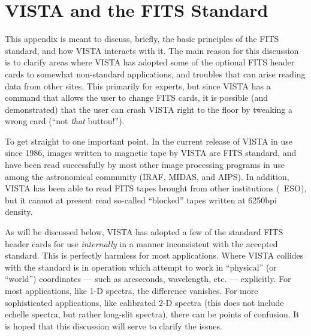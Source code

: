 %
%
%
%
%
%

%
%
%
%
%

\chapter{VISTA and the FITS Standard}

This appendix is meant to discuss, briefly, the basic principles of the FITS
standard, and how VISTA interacts with it.  The main reason for this
discussion is to clarify areas where VISTA has adopted some of the optional
FITS header cards to somewhat non-standard applications, and troubles that can
arise reading data from other sites.   This primarily for experts, but since
VISTA has a  command that allows the user to change FITS cards,
it is possible (and demonstrated) that the user can crash VISTA right to the
floor by tweaking a wrong card (``not {\it that} button!'').

To get straight to one important point.  In the current release of VISTA in
use since 1986, images written to magnetic tape by VISTA are FITS standard,
and have been read successfully by most other image processing programs in use
among the astronomical community (IRAF, MIDAS, and AIPS).  In addition, VISTA
has been able to read FITS tapes brought from other institutions (\eg\ ESO),
but it cannot at present read so-called ``blocked'' tapes written at 6250bpi
density.

As will be discussed below, VISTA has adopted a few of the standard FITS
header cards for use {\it internally} in a manner inconsistent with the
accepted standard.  This is perfectly harmless for most applications.  Where
VISTA collides with the standard is in operation which attempt to work in
``physical'' (or ``world'') coordinates --- such as arcseconds, wavelength,
etc. --- explicitly.  For most applications, like 1-D spectra, the difference
vanishes.  For more sophisticated applications, like calibrated 2-D spectra
(this does not include echelle spectra, but rather long-slit spectra), there
can be points of confusion.  It is hoped that this discussion will serve to
clarify the issues.

